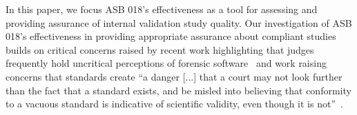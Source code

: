 In this paper, we focus ASB 018's effectiveness as a tool for assessing and providing assurance of internal validation study quality. Our investigation of ASB 018's effectiveness in providing appropriate assurance about compliant studies builds on critical concerns raised by recent work highlighting that judges frequently hold uncritical perceptions of forensic software~\cite{jin2024beyond} and work raising concerns that standards create ``a danger [...] that a court may not look further than the fact that a standard exists, and be misled into believing that conformity to a vacuous standard is indicative of scientific validity, even though it is not''~\cite[p.207]{morrison2020vacuous}.


